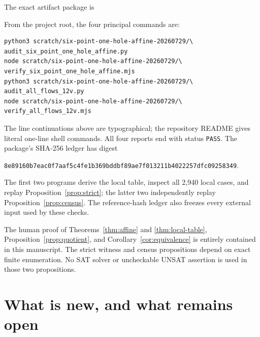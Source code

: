 \documentclass[11pt]{article}
\theoremstyle{definition}
\theoremstyle{remark}
\numberwithin{equation}{section}
\begin{document}
The exact artifact package is
\begin{center}
\end{center}
From the project root, the four principal commands are:
\begin{verbatim}
python3 scratch/six-point-one-hole-affine-20260729/\
audit_six_point_one_hole_affine.py
node scratch/six-point-one-hole-affine-20260729/\
verify_six_point_one_hole_affine.mjs
python3 scratch/six-point-one-hole-affine-20260729/\
audit_all_flows_12v.py
node scratch/six-point-one-hole-affine-20260729/\
verify_all_flows_12v.mjs
\end{verbatim}
The line continuations above are typographical; the repository README
gives literal one-line shell commands.  All four reports end with status
\texttt{PASS}.  The package's SHA-256 ledger has digest
\begin{center}
\scriptsize
\nolinkurl{8e89160b7eac0f7aaf5c4fe1b369bddbf89ae7f013211b4022257dfc09258349}.
\end{center}
The first two programs derive the local table, inspect all 2,940 local
cases, and replay Proposition~\ref{prop:strict}; the latter two independently
replay Proposition~\ref{prop:census}.  The reference-hash ledger also
freezes every external input used by these checks.

The human proof of Theorems~\ref{thm:affine} and
\ref{thm:local-table}, Proposition~\ref{prop:quotient}, and
Corollary~\ref{cor:equivalence} is entirely contained in this manuscript.
The strict witness and census propositions depend on exact finite
enumeration.  No SAT solver or uncheckable UNSAT assertion is used in
those two propositions.

\section{What is new, and what remains open}
\end{document}
